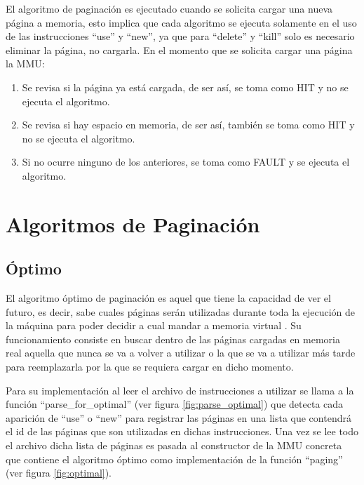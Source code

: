 \documentclass{report}
\begin{document}
El algoritmo de paginación es ejecutado cuando se solicita cargar una nueva página a memoria, esto implica que cada algoritmo se ejecuta solamente en el uso de las instrucciones ``use''  y ``new'', ya que para ``delete''  y ``kill'' solo es necesario eliminar la página, no cargarla.
En el momento que se solicita cargar una página la MMU:
\begin{enumerate}
    \item Se revisa si la página ya está cargada, de ser así, se toma como HIT y no se ejecuta el algoritmo.
    \item Se revisa si hay espacio en memoria, de ser así, también se toma como HIT y no se ejecuta el algoritmo. 
    \item Si no ocurre ninguno de los anteriores, se toma como FAULT y se ejecuta el algoritmo.
\end{enumerate}


\section {Algoritmos de Paginación}

\subsection{Óptimo}
El algoritmo óptimo de paginación es aquel que tiene la capacidad de ver el futuro, es decir, sabe cuales páginas serán utilizadas durante toda la ejecución de la máquina para poder decidir a cual mandar a memoria virtual \cite{ref0}. 
Su funcionamiento consiste en buscar dentro de las páginas cargadas en memoria real aquella que nunca se va a volver a utilizar o la que se va a utilizar más tarde para reemplazarla por la que se requiera cargar en dicho momento. 

Para su implementación al leer el archivo de instrucciones a utilizar se llama a la función ``parse\_for\_optimal'' (ver figura \ref{fig:parse_optimal}) que detecta cada aparición de ``use'' o ``new'' para registrar las páginas en una lista que contendrá el id de las páginas que son utilizadas en dichas instrucciones. Una vez se lee todo el archivo dicha lista de páginas es pasada al constructor de la MMU concreta que contiene el algoritmo óptimo como implementación de la función ``paging'' (ver figura \ref{fig:optimal}).
\end{document}
